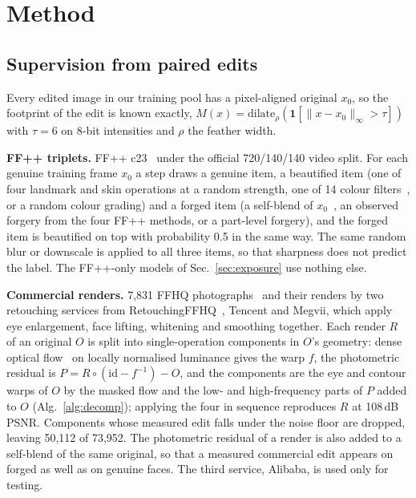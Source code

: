 \documentclass[conference]{IEEEtran}
\begin{document}
\section{Method}
\label{sec:method}
\subsection{Supervision from paired edits}
\label{sec:data}
Every edited image in our training pool has a pixel-aligned original $x_0$, so the footprint of the edit is known
exactly, $M(x)=\mathrm{dilate}_\rho(\mathbf{1}[\|x-x_0\|_\infty>\tau])$ with $\tau=6$ on 8-bit intensities and $\rho$
the feather width.

\textbf{FF++ triplets.} FF++ c23~\cite{ffpp} under the official 720/140/140 video split. For each genuine training frame
$x_0$ a step draws a genuine item, a beautified item (one of four landmark and skin operations at a random strength, one
of 14 colour filters~\cite{pilgram}, or a random colour grading) and a forged item (a self-blend of $x_0$~\cite{sbi}, an
observed forgery from the four FF++ methods, or a part-level forgery), and the forged item is beautified on top with
probability 0.5 in the same way. The same random blur or downscale is applied to all three items, so that sharpness does
not predict the label. The FF++-only models of Sec.~\ref{sec:exposure} use nothing else.

\textbf{Commercial renders.} 7,831 FFHQ photographs~\cite{ffhq} and their renders by two retouching services from
RetouchingFFHQ~\cite{retouchingffhq}, Tencent and Megvii, which apply eye enlargement, face lifting, whitening and
smoothing together. Each render $R$ of an original $O$ is split into single-operation components in $O$'s geometry:
dense optical flow~\cite{dis} on locally normalised luminance gives the warp $f$, the photometric residual is
$P=R\circ(\mathrm{id}-f^{-1})-O$, and the components are the eye and contour warps of $O$ by the masked flow and the
low- and high-frequency parts of $P$ added to $O$ (Alg.~\ref{alg:decomp}); applying the four in sequence reproduces $R$
at 108\,dB PSNR. Components whose measured edit falls under the noise floor are dropped, leaving 50,112 of 73,952. The
photometric residual of a render is also added to a self-blend of the same original, so that a measured commercial edit
appears on forged as well as on genuine faces. The third service, Alibaba, is used only for testing.
\end{document}
